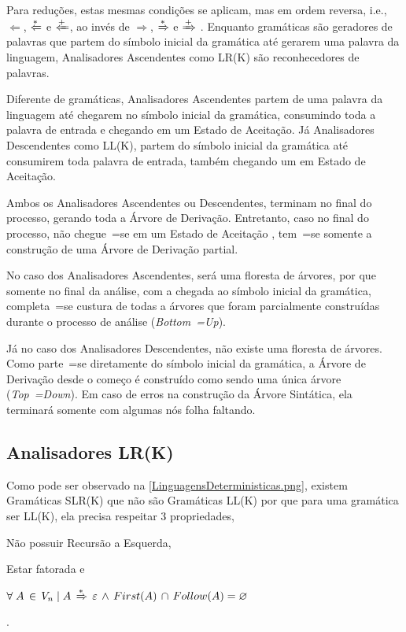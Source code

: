    Para reduções,
    estas mesmas condições se aplicam,
    mas em ordem reversa,
    i.e., $\Leftarrow$, $\xLeftarrow{*}$ e $\xLeftarrow{+}$,
    ao invés de $\Rightarrow$,
    $\xRightarrow{*}$ e
    $\xRightarrow{+}$ \cite{ahoCompilerDragonBook}.
    Enquanto gramáticas são geradores de palavras que partem do símbolo inicial da gramática até gerarem uma palavra da linguagem,
    Analisadores Ascendentes como LR(K) são reconhecedores de palavras.

    Diferente de gramáticas,
    Analisadores Ascendentes partem de uma palavra da linguagem até chegarem no símbolo inicial da gramática,
    consumindo toda a palavra de entrada e
    chegando em um Estado de Aceitação.
    Já Analisadores Descendentes como LL(K),
    partem do símbolo inicial da gramática até consumirem toda palavra de entrada,
    também chegando um em Estado de Aceitação.

    Ambos os Analisadores Ascendentes ou
    Descendentes,
    terminam no final do processo,
    gerando toda a Árvore de Derivação.
    Entretanto,
    caso no final do processo,
    não chegue~=se em um Estado de Aceitação \cite{ahoCompilerDragonBook},
    tem~=se somente a construção de uma Árvore de Derivação partial.

    No caso dos Analisadores Ascendentes,
    será uma floresta de árvores,
    por que somente no final da análise,
    com a chegada ao símbolo inicial da gramática,
    completa~=se custura de todas a árvores que foram parcialmente construídas durante o processo de análise (\textit{Bottom~=Up}).

    Já no caso dos Analisadores Descendentes,
    não existe uma floresta de árvores.
    Como parte~=se diretamente do símbolo inicial da gramática,
    a Árvore de Derivação desde o começo é construído como sendo uma única árvore (\textit{Top~=Down}).
    Em caso de erros na construção da Árvore Sintática,
    ela terminará somente com algumas nós folha faltando.


\subsection{Analisadores LR(K)}

    Como pode ser observado na \autoref{LinguagensDeterministicas.png},
    existem Gramáticas SLR(K) que não são Gramáticas LL(K) por que para uma gramática ser LL(K),
    ela precisa respeitar 3 propriedades,
    \begin{inparaenum}
        \item Não possuir Recursão a Esquerda,
        \item Estar fatorada e
        \item $\forall\; A\, \in\, V_n\; |\; A\,
                \xRightarrow{*}\, \varepsilon\,
                \land\, First(A)\, \cap\, Follow(A) = \varnothing$
    \end{inparaenum}
    \cite{ahoCompilerDragonBook}.

